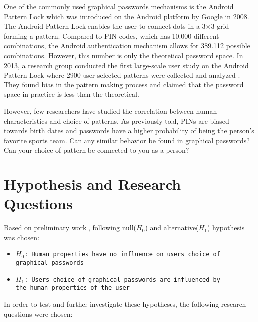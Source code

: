     One of the commonly used graphical passwords mechanisms is the Android Pattern Lock which was introduced on the Android platform by Google in 2008. The Android Pattern Lock enables the user to connect dots in a 3$\times$3 grid forming a pattern. Compared to PIN codes, which has 10.000 different combinations, the Android authentication mechanism allows for 389.112 possible combinations. However, this number is only the theoretical password space. In 2013, a research group conducted the first large-scale user study on the Android Pattern Lock where 2900 user-selected patterns were collected and analyzed \cite{Uellenbeck}. They found bias in the pattern making process and claimed that the password space in practice is less than the theoretical.

    However, few researchers have studied the correlation between human characteristics and choice of patterns. As previously told, PINs are biased towards birth dates and passwords have a higher probability of being the person's favorite sports team. Can any similar behavior be found in graphical passwords? Can your choice of pattern be connected to you as a person?

  \section{Hypothesis and Research Questions}\label{sec:hypothesis}
    Based on preliminary work \cite{prosjektoppgave}, following null($H_0$) and alternative($H_1$) hypothesis was chosen:

    {\renewcommand\labelitemi{}
      \begin{itemize}
        \item \texttt{$H_{0}$: Human properties have no influence on users choice of \\graphical passwords}
        \item \texttt{$H_{1}$: Users choice of graphical passwords are influenced by \\the human properties of the user}
      \end{itemize}
    }
    
    In order to test and further investigate these hypotheses, the following research questions were chosen:

